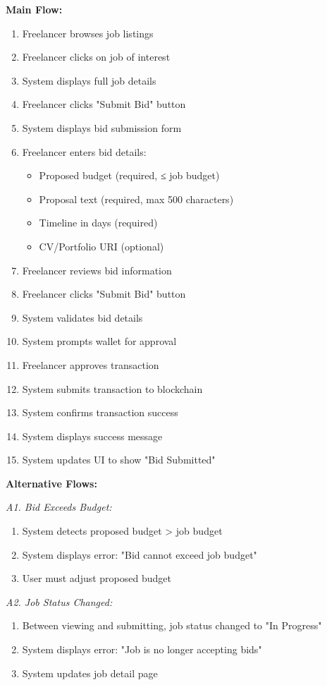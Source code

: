 \documentclass[a4paper,13pt,twoside]{report}
\theoremstyle{definition}
\begin{document}
\textbf{Main Flow:}
\begin{enumerate}
    \item Freelancer browses job listings
    \item Freelancer clicks on job of interest
    \item System displays full job details
    \item Freelancer clicks "Submit Bid" button
    \item System displays bid submission form
    \item Freelancer enters bid details:
    \begin{itemize}
        \item Proposed budget (required, ≤ job budget)
        \item Proposal text (required, max 500 characters)
        \item Timeline in days (required)
        \item CV/Portfolio URI (optional)
    \end{itemize}
    \item Freelancer reviews bid information
    \item Freelancer clicks "Submit Bid" button
    \item System validates bid details
    \item System prompts wallet for approval
    \item Freelancer approves transaction
    \item System submits transaction to blockchain
    \item System confirms transaction success
    \item System displays success message
    \item System updates UI to show "Bid Submitted"
\end{enumerate}

\textbf{Alternative Flows:}

\textit{A1. Bid Exceeds Budget:}
\begin{enumerate}
    \item System detects proposed budget > job budget
    \item System displays error: "Bid cannot exceed job budget"
    \item User must adjust proposed budget
\end{enumerate}

\textit{A2. Job Status Changed:}
\begin{enumerate}
    \item Between viewing and submitting, job status changed to "In Progress"
    \item System displays error: "Job is no longer accepting bids"
    \item System updates job detail page
\end{enumerate}
\end{document}
